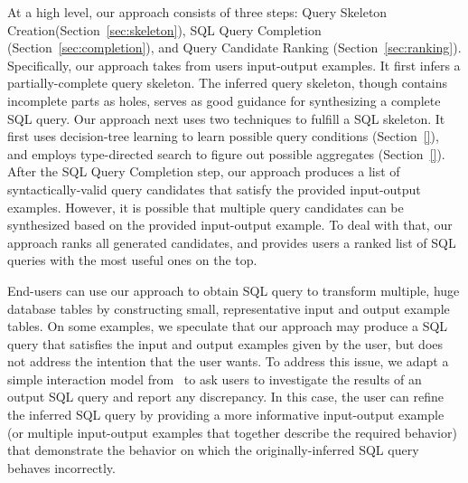 At a high level, our approach consists of three steps: Query Skeleton
Creation(Section~\ref{sec:skeleton}), SQL Query Completion
(Section~\ref{sec:completion}), and Query Candidate Ranking (Section~\ref{sec:ranking}).
Specifically, our approach takes from users input-output examples. It first infers
a partially-complete query skeleton. The inferred query skeleton, though contains
incomplete parts as holes, serves as good guidance for synthesizing a complete SQL query.
Our approach next uses two techniques to fulfill a SQL skeleton. It first
uses decision-tree learning to learn possible query conditions (Section~\ref{}), and
 employs type-directed search to figure out possible aggregates (Section~\ref{}).
After the SQL Query Completion step, our approach produces a list of syntactically-valid
query candidates that satisfy the provided input-output examples.
However, it is possible that multiple query candidates can be synthesized based on the
provided input-output example. To deal with that, our approach ranks all generated candidates,
and provides users a ranked list of SQL queries with the most useful ones on the top. 


End-users can use our approach to obtain SQL query to transform
multiple, huge database tables by constructing small, representative
input and output example tables. On some examples, we speculate
that our approach
may produce a SQL query that satisfies the input and output examples
given by the user, but does not address the intention
that the user wants. To address this issue, we adapt a simple
interaction model from~\cite{Harris:2011} to ask users to investigate the results of
an output SQL query and report any discrepancy. In this case,
the user can refine the inferred SQL query by providing a more
informative input-output example (or multiple input-output examples
that together describe the required behavior) that demonstrate the behavior on
which the originally-inferred SQL query behaves incorrectly.











